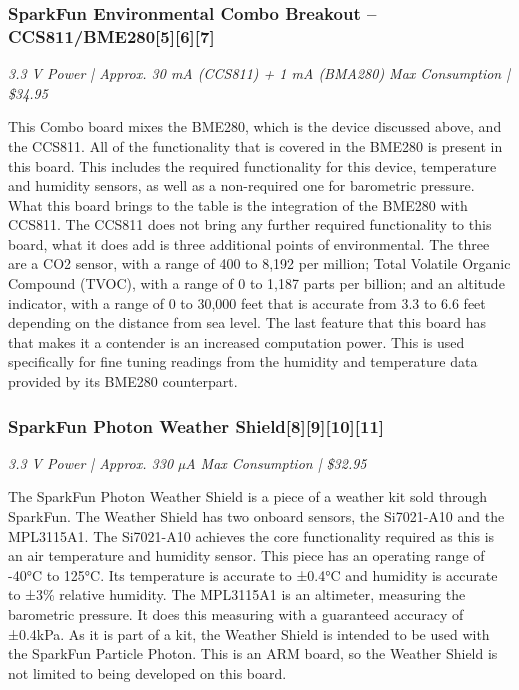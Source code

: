 \documentclass[IEEEtran,letterpaper,10pt,titlepage,fleqn,draftclsnofoot,onecolumn]{article}
\begin{document}
\subsubsection{SparkFun Environmental Combo Breakout – CCS811/BME280[5][6][7]}
\textit{3.3 V Power | Approx. 30 mA (CCS811) + 1 mA (BMA280) Max Consumption | \$34.95}

\vspace{1mm}

This Combo board mixes the BME280, which is the device discussed above, and the CCS811. All of the functionality that is covered in the BME280 is present in this board. This includes the required functionality for this device, temperature and humidity sensors, as well as a non-required one for barometric pressure. What this board brings to the table is the integration of the BME280 with CCS811. The CCS811 does not bring any further required functionality to this board, what it does add is three additional points of environmental. The three are a CO2 sensor, with a range of 400 to 8,192 per million; Total Volatile Organic Compound (TVOC), with a range of 0 to 1,187 parts per billion; and an altitude indicator, with a range of 0 to 30,000 feet that is accurate from 3.3 to 6.6 feet depending on the distance from sea level. The last feature that this board has that makes it a contender is an increased computation power. This is used specifically for fine tuning readings from the humidity and temperature data provided by its BME280 counterpart.

\clearpage

\subsubsection{SparkFun Photon Weather Shield[8][9][10][11]}
\textit{3.3 V Power | Approx. 330 µA Max Consumption | \$32.95}

\vspace{1mm}

The SparkFun Photon Weather Shield is a piece of a weather kit sold through SparkFun. The Weather Shield has two onboard sensors, the Si7021-A10 and the MPL3115A1. The Si7021-A10 achieves the core functionality required as this is an air temperature and humidity sensor. This piece has an operating range of -40°C to 125°C. Its temperature is accurate to ±0.4°C and humidity is accurate to ±3\% relative humidity. The MPL3115A1 is an altimeter, measuring the barometric pressure. It does this measuring with a guaranteed accuracy of ±0.4kPa. As it is part of a kit, the Weather Shield is intended to be used with the SparkFun Particle Photon. This is an ARM board, so the Weather Shield is not limited to being developed on this board.
\end{document}
